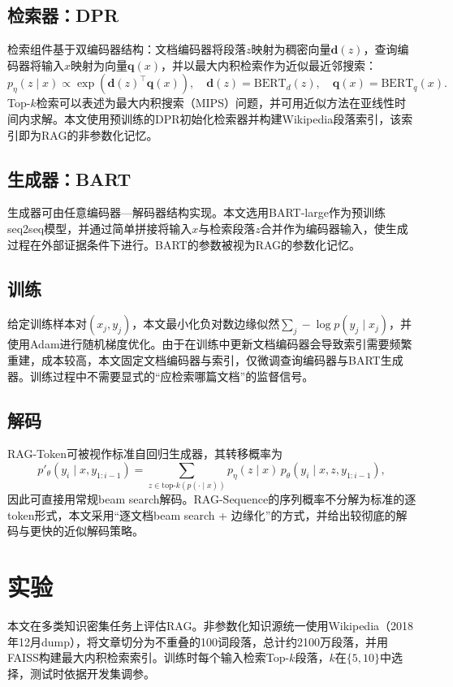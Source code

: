 \subsection{检索器：DPR}
检索组件基于双编码器结构：文档编码器将段落$z$映射为稠密向量$\mathbf{d}(z)$，查询编码器将输入$x$映射为向量$\mathbf{q}(x)$，并以最大内积检索作为近似最近邻搜索：
\[
p_{\eta}(z\mid x)\propto \exp\left(\mathbf{d}(z)^{\top}\mathbf{q}(x)\right),\quad
\mathbf{d}(z)=\mathrm{BERT}_d(z),\quad \mathbf{q}(x)=\mathrm{BERT}_q(x).
\]
Top-$k$检索可以表述为最大内积搜索（MIPS）问题，并可用近似方法在亚线性时间内求解。本文使用预训练的DPR初始化检索器并构建Wikipedia段落索引，该索引即为RAG的非参数化记忆。

\subsection{生成器：BART}
生成器可由任意编码器—解码器结构实现。本文选用BART-large作为预训练seq2seq模型，并通过简单拼接将输入$x$与检索段落$z$合并作为编码器输入，使生成过程在外部证据条件下进行。BART的参数被视为RAG的参数化记忆。

\subsection{训练}
给定训练样本对$(x_j, y_j)$，本文最小化负对数边缘似然$\sum_j -\log p(y_j\mid x_j)$，并使用Adam进行随机梯度优化。由于在训练中更新文档编码器会导致索引需要频繁重建，成本较高，本文固定文档编码器与索引，仅微调查询编码器与BART生成器。训练过程中不需要显式的“应检索哪篇文档”的监督信号。

\subsection{解码}
RAG-Token可被视作标准自回归生成器，其转移概率为
\[
p'_{\theta}(y_i\mid x,y_{1:i-1})=\sum_{z\in \text{top-}k(p(\cdot\mid x))} p_{\eta}(z\mid x)\,p_{\theta}(y_i\mid x,z,y_{1:i-1}),
\]
因此可直接用常规beam search解码。RAG-Sequence的序列概率不分解为标准的逐token形式，本文采用“逐文档beam search + 边缘化”的方式，并给出较彻底的解码与更快的近似解码策略。

\section{实验}
本文在多类知识密集任务上评估RAG。非参数化知识源统一使用Wikipedia（2018年12月dump），将文章切分为不重叠的100词段落，总计约2100万段落，并用FAISS构建最大内积检索索引。训练时每个输入检索Top-$k$段落，$k$在$\{5,10\}$中选择，测试时依据开发集调参。

